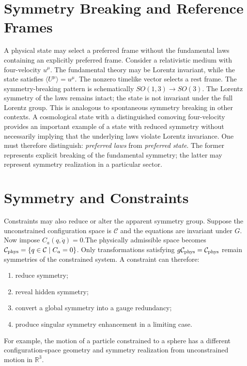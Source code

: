 \section{ Symmetry Breaking and Reference Frames}
A physical state may select a preferred frame without the fundamental laws containing an explicitly preferred frame.
Consider a relativistic medium with four-velocity $u^\mu$.
The fundamental theory may be Lorentz invariant, while the state satisfies
$\langle U^\mu\rangle=u^\mu$.
The nonzero timelike vector selects a rest frame.
The symmetry-breaking pattern is schematically
$SO(1,3)\rightarrow SO(3)$.
The Lorentz symmetry of the laws remains intact; the state is not invariant under the full Lorentz group.
This is analogous to spontaneous symmetry breaking in other contexts.
A cosmological state with a distinguished comoving four-velocity provides an important example of a state with reduced symmetry without necessarily implying that the underlying laws violate Lorentz invariance.
One must therefore distinguish: \emph{preferred laws} from \emph{preferred state}.
The former represents explicit breaking of the fundamental symmetry; 
the latter may represent symmetry realization in a particular sector.

\section{ Symmetry and Constraints}
Constraints may also reduce or alter the apparent symmetry group.
Suppose the unconstrained configuration space is $\mathcal{C}$ and the equations 
are invariant under $G$.
Now impose $C_a(q,\dot q)=0$.The physically admissible space becomes
$\mathcal{C}_{\rm phys}=\{q\in\mathcal{C}\mid C_a=0\}$.
Only transformations satisfying 
$g\mathcal{C}_{\rm phys}=\mathcal{C}_{\rm phys}$
remain symmetries of the constrained system.
A constraint can therefore:
\begin{enumerate}
\item reduce symmetry;
\item reveal hidden symmetry;
\item convert a global symmetry into a gauge redundancy;
\item produce singular symmetry enhancement in a limiting case.
\end{enumerate}
For example, the motion of a particle constrained to a sphere has a different 
configuration-space geometry and symmetry realization from unconstrained motion
in $\mathbb{R}^3$.


